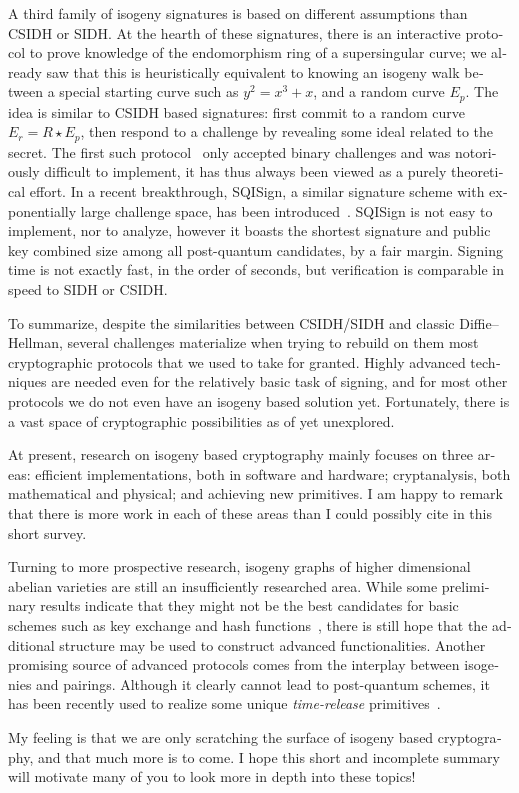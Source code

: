 \begin{otherlanguage}{english}
A third family of isogeny signatures is based on different assumptions
than CSIDH or SIDH. At the hearth of these signatures, there is an
interactive protocol to prove knowledge of the endomorphism ring of a
supersingular curve; we already saw that this is heuristically
equivalent to knowing an isogeny walk between a special starting curve
such as $y^2=x^3+x$, and a random curve $E_p$. The idea is similar to
CSIDH based signatures: first commit to a random curve
$E_r=R\star E_p$, then respond to a challenge by revealing some ideal
related to the secret. The first such
protocol~\cite{AC:GalPetSil17,JC:GalPetSil20} only accepted binary
challenges and was notoriously difficult to implement, it has thus
always been viewed as a purely theoretical effort. In a recent
breakthrough, SQISign, a similar signature scheme with exponentially
large challenge space, has been introduced~\cite{AC:DKLPW20}.  SQISign
is not easy to implement, nor to analyze, however it boasts the
shortest signature and public key combined size among all post-quantum
candidates, by a fair margin. Signing time is not exactly fast, in the
order of seconds, but verification is comparable in speed to SIDH or
CSIDH.

To summarize, despite the similarities between CSIDH/SIDH and classic
Diffie--Hellman, several challenges materialize when trying to rebuild
on them most cryptographic protocols that we used to take for granted.
Highly advanced techniques are needed even for the relatively basic
task of signing, and for most other protocols we do not even have an
isogeny based solution yet. Fortunately, there is a vast space of
cryptographic possibilities as of yet unexplored.

At present, research on isogeny based cryptography mainly focuses on
three areas: efficient implementations, both in software and hardware;
cryptanalysis, both mathematical and physical; and achieving new
primitives. I am happy to remark that there is more work in each of
these areas than I could possibly cite in this short survey.

Turning to more prospective research, isogeny graphs of higher
dimensional abelian varieties are still an insufficiently researched
area. While some preliminary results indicate that they might not be
the best candidates for basic schemes such as key
exchange and hash functions~\cite{PQCRYPTO:FlyTi19,10.1515/jmc-2019-0021,PQCRYPTO:CosSmi20},
there is still hope that the additional structure may be used to
construct advanced functionalities. Another promising source of
advanced protocols comes from the interplay between isogenies and
pairings. Although it clearly cannot lead to post-quantum schemes, it
has been recently used to realize some unique \emph{time-release}
primitives~\cite{AC:DMPS19,EPRINT:BurDeF20}.

My feeling is that we are only scratching the surface of isogeny based
cryptography, and that much more is to come. I hope this short and
incomplete summary will motivate many of you to look more in depth
into these topics!

\end{otherlanguage}

